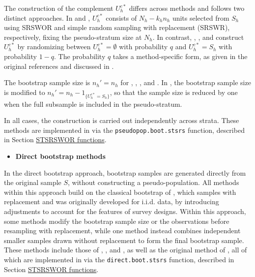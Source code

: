 The construction of the complement \(U_h^{c*}\) differs across methods and follows two distinct approaches. In \citet{Booth:Butler:Hall:1994} and \citet{Chao:Lo:1994}, \(U_h^{c*}\) consists of \(N_h - k_h n_h\) units selected from \(\textrm{$S$}_h\) using SRSWOR and simple random sampling with replacement (SRSWR), respectively, fixing the pseudo-stratum size at \(N_h\). In contrast, \citet{Bickel:Freedman:1984}, \citet{Chao:Lo:1985}, and \citet{Sitter:1992a} construct \(U_h^{c*}\) by randomizing between \(U_h^{c*} = \emptyset\) with probability \(q\) and \(U_h^{c*} = \textrm{$S$}_h\) with probability \(1 - q\). The probability \(q\) takes a method-specific form, as given in the original references and discussed in \citet{Mashreghi:Haziza:Leger:2016}.

The bootstrap sample size is \(n_h' = n_h\) for \citet{Booth:Butler:Hall:1994}, \citet{Chao:Lo:1994}, \citet{Bickel:Freedman:1984}, and \citet{Chao:Lo:1985}. In \citet{Sitter:1992a}, the bootstrap sample size is modified to \(n_h' = n_h - 1_{\{U_h^{c*} = \textrm{$S$}_h\}}\), so that the sample size is reduced by one when the full subsample is included in the pseudo-stratum.

In all cases, the construction is carried out independently across strata.
These methods are implemented in  via the \texttt{pseudopop.boot.stsrs} function, described in Section \hyperref[sec:pkgbootsurvsrs]{STSRSWOR functions}.

\begin{itemize}
\tightlist
\item
  \textbf{Direct bootstrap methods}
\end{itemize}

\noindent In the direct bootstrap approach, bootstrap samples are generated directly from the original sample \(\textrm{$S$}\), without constructing a pseudo-population. All methods within this approach build on the classical bootstrap of \citet{Efron:1979}, which samples with replacement and was originally developed for i.i.d. data, by introducing adjustments to account for the features of survey designs. Within this approach, some methods modify the bootstrap sample size or the observations before resampling with replacement, while one method instead combines independent smaller samples drawn without replacement to form the final bootstrap sample. These methods include those of \citet{McCarthy:Snowden:1985}, \citet{Rao:Wu:1988}, and \citet{Sitter:1992b}, as well as the original method of \citet{Efron:1979}, all of which are implemented in  via the \texttt{direct.boot.stsrs} function, described in Section \hyperref[sec:pkgbootsurvsrs]{STSRSWOR functions}.

